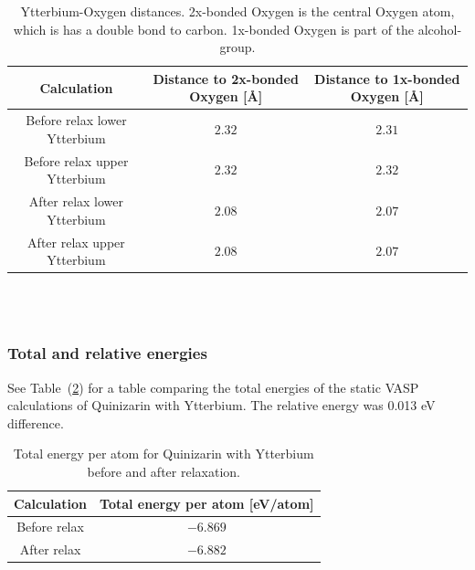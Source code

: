 \documentclass{article}
\begin{document}
      \begin{table}[H]
        \centering
        \caption{Ytterbium-Oxygen distances. 2x-bonded Oxygen is the central Oxygen atom, which is has a double bond to carbon. 1x-bonded Oxygen is part of the alcohol-group. }
        \label{tab:neighborYb}
        \begin{tabular}{|c|c|c|}
            \hline
            Calculation & Distance to 2x-bonded Oxygen [Å] & Distance to 1x-bonded Oxygen [Å]  \\
            \hline \hline
            Before relax lower Ytterbium & $2.32$ & $2.31$ \\
            Before relax upper Ytterbium & $2.32$ & $2.32$ \\
            After relax lower Ytterbium & $2.08$ & $2.07$ \\
            After relax upper Ytterbium & $2.08$ & $2.07$ \\
            \hline
        \end{tabular} \\
        \hspace{0pt}\\
      \end{table}


      \vspace{1cm}

    \subsubsection{Total and relative energies}

      See Table~(\ref{tab:TOTENYb}) for a table comparing the total energies of the static VASP calculations of Quinizarin with Ytterbium. The relative energy was 0.013 eV difference. \\

      \begin{table}[H]
        \centering
        \caption{Total energy per atom for Quinizarin with Ytterbium before and after relaxation. }
        \label{tab:TOTENYb}
        \begin{tabular}{|c|c|}
            \hline
            Calculation & Total energy per atom [eV/atom]  \\
            \hline \hline
            Before relax & $-6.869$ \\
            After relax & $-6.882$ \\
            \hline
        \end{tabular} \\
        \hspace{0pt}\\
      \end{table}
\end{document}
